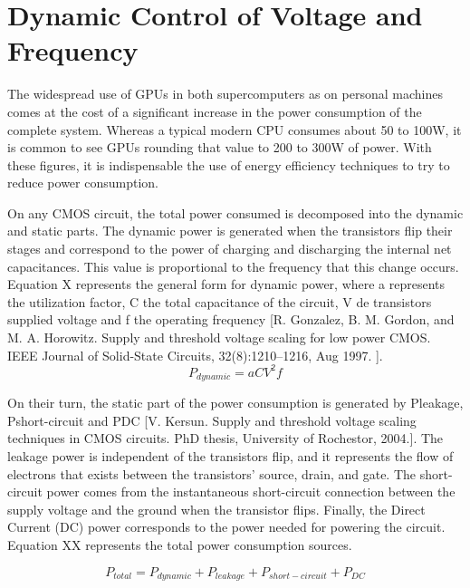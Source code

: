 

\section{Dynamic Control of Voltage and Frequency}
\label{section:dcvf}

The widespread use of GPUs in both supercomputers as on personal machines comes at the cost of a significant increase in the power consumption of the complete system. Whereas a typical modern CPU consumes about 50 to 100W, it is common to see GPUs rounding that value to 200 to 300W of power. With these figures, it is indispensable the use of energy efficiency techniques to try to reduce power consumption.

On any CMOS circuit, the total power consumed is decomposed into the dynamic and static parts. The dynamic power is generated when the transistors flip their stages and correspond to the power of charging and discharging the internal net capacitances. This value is proportional to the frequency that this change occurs. Equation X represents the general form for dynamic power, where a represents the utilization factor, C the total capacitance of the circuit, V de transistors supplied voltage and f the operating frequency [R. Gonzalez, B. M. Gordon, and M. A. Horowitz. Supply and threshold voltage scaling for low power CMOS. IEEE Journal of Solid-State Circuits, 32(8):1210–1216, Aug 1997.
].
\begin{equation}
    P_{dynamic} = aCV^2f
\end{equation}


On their turn, the static part of the power consumption is generated by Pleakage, Pshort-circuit and PDC [V. Kersun. Supply and threshold voltage scaling techniques in CMOS circuits. PhD thesis, University of Rochestor, 2004.]. The leakage power is independent of the transistors flip, and it represents the flow of electrons that exists between the transistors' source, drain, and gate. The short-circuit power comes from the instantaneous short-circuit connection between the supply voltage and the ground when the transistor flips. Finally, the Direct Current (DC) power corresponds to the power needed for powering the circuit. Equation XX represents the total power consumption sources.

\begin{equation}
    P_{total} = P_{dynamic} + P_{leakage} + P_{short-circuit} + P_{DC}
\end{equation}

